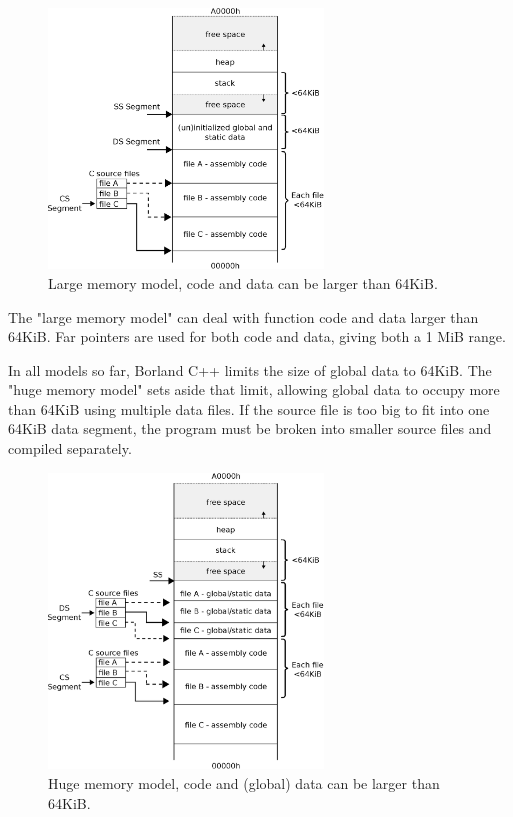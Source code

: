 \documentclass[book.tex]{subfiles}
\begin{document}
\begin{figure}[H]
\centering
\includegraphics[width=0.65\textwidth]{imgs/drawings/memory/large_mm.eps}
\caption{Large memory model, code and data can be larger than 64KiB.}
\label{fig:mm_large}
\end{figure}



\par
The "large memory model" can deal with function code and data larger than 64KiB. Far pointers are used for both code and data, giving both a 1 MiB range.\\

\par
In all models so far, Borland C++ limits the size of global data to 64KiB. The "huge memory model" sets aside that limit, allowing global data to occupy more than 64KiB using multiple data files. If the source file is too big to fit into one 64KiB data segment, the program must be broken into smaller source files and compiled separately.\\
\begin{figure}[H]
\centering
\includegraphics[width=0.65\textwidth]{imgs/drawings/memory/huge_mm.eps}
\caption{Huge memory model, code and (global) data can be larger than 64KiB.}
\label{fig:mm_large}
\end{figure}
\end{document}
